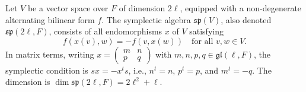 Let $V$ be a vector space over $F$ of dimension $2\ell$, equipped with a non-degenerate alternating bilinear form $f$. The symplectic algebra $\mathfrak{sp}(V)$, also denoted $\mathfrak{sp}(2\ell, F)$, consists of all endomorphisms $x$ of $V$ satisfying
$$f(x(v), w) = -f(v, x(w)) \quad \text{for all } v, w \in V.$$
In matrix terms, writing $x = \begin{pmatrix} m & n \\ p & q \end{pmatrix}$ with $m, n, p, q \in \mathfrak{gl}(\ell, F)$, the symplectic condition is $sx = -x^t s$, i.e., $n^t = n$, $p^t = p$, and $m^t = -q$. The dimension is $\dim \mathfrak{sp}(2\ell, F) = 2\ell^2 + \ell$.
